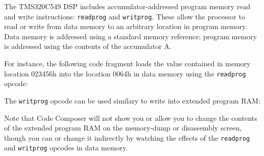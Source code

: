 
%
%
%
%
%

The TMS320C549 DSP includes accumulator-addressed program memory read
and write instructions: \verb+readprog+ and \verb+writprog+. These allow the
processor to read or write from data memory to an arbitrary location
in program memory. Data memory is addressed using a standard memory
reference; program memory is addressed using the contents of the
accumulator A.

For instance, the following code fragment loads the value contained
in memory location 023456h into the location 0064h in data memory
using the \verb+readprog+ opcode:

\setlength{\baselineskip}{0.4cm}
\setlength{\baselineskip}{0.5cm}

The \verb+writprog+ opcode can be used similary to write into extended program
RAM:

\setlength{\baselineskip}{0.4cm}
\setlength{\baselineskip}{0.5cm}

Note that Code Composer will not show you or allow you to change the
contents of the extended program
RAM on the memory-dump or disassembly screen, though you can or change it
indirectly by watching the effects of the \verb+readprog+ and \verb+writprog+
opcodes in data memory.

